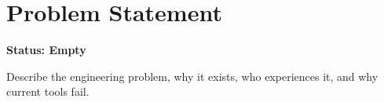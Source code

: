 \section{Problem Statement}
\textbf{Status: Empty}

Describe the engineering problem, why it exists, who experiences it, and why current tools fail.
